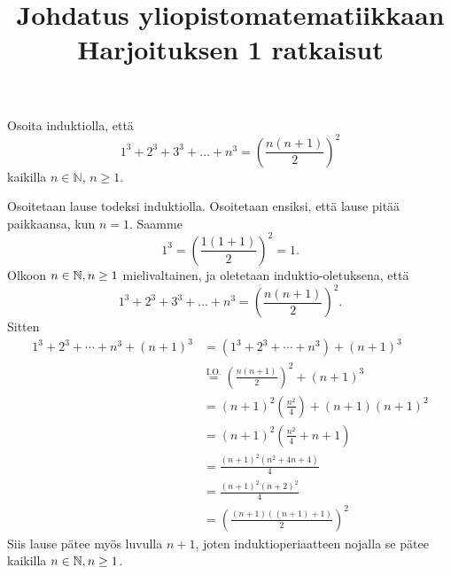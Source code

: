 \documentclass[11pt,a4paper]{amsart}
\title{Johdatus yliopistomatematiikkaan\\Harjoituksen 1 ratkaisut}
\date{}
\author{}
\begin{document}

\begin{exercise}
  Osoita induktiolla, että
  \[
    1^3 + 2^3 + 3^3 + \dots + n^3 =\left(\frac{n(n + 1)}{2}\right)^2
  \]
  kaikilla \(n \in \mathbb{N}\), \(n \geq 1\).
\end{exercise}

\begin{solution}
  Osoitetaan lause todeksi induktiolla. Osoitetaan ensiksi, että lause
  pitää paikkaansa, kun \(n = 1\). Saamme
  \[
    1^3 = \left(\frac{1(1 + 1)}{2}\right)^2 = 1.
  \]
  Olkoon \(n \in \mathbb{N}, n \geq 1\) mielivaltainen, ja oletetaan
  induktio-oletuksena, että
  \[
    1^3 + 2^3 + 3^3 + \dots + n^3 =\left(\frac{n(n + 1)}{2}\right)^2.
  \] Sitten
  \begin{align*}
    1^3 + 2^3 + \cdots + n^3 + (n + 1)^3
    &= (1^3 + 2^3 + \cdots + n^3) + (n + 1)^3 \\
    &\overset{\text{I.O.}}{=} \left(\frac{n(n + 1)}{2}\right)^2
    + (n + 1)^3 \\
    &= (n + 1)^2\left(\frac{n^2}{4}\right) + (n + 1)(n + 1)^2 \\
    &= (n + 1)^2\left(\frac{n^2}{4} + n + 1\right) \\
    &= \frac{(n + 1)^2(n^2 + 4n + 4)}{4} \\
    &= \frac{(n + 1)^2(n + 2)^2}{4} \\
    &= \left(\frac{(n + 1)((n + 1) + 1)}{2}\right)^2
  \end{align*}
  Siis lause pätee myös luvulla \(n + 1\), joten induktioperiaatteen nojalla
  se pätee kaikilla \(n \in \mathbb{N}, n \geq 1\).
\end{solution}
\end{document}
